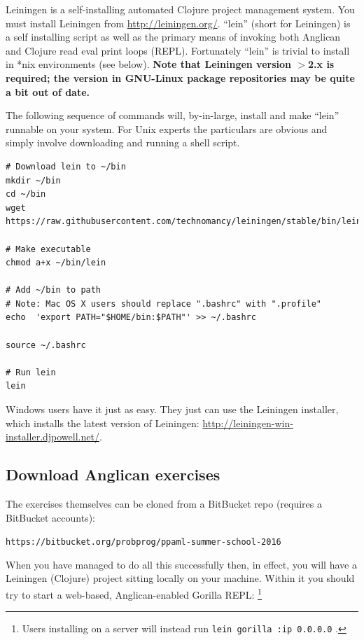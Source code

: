 \documentclass{article}
\begin{document}
Leiningen is a self-installing automated Clojure project management system.  
You must install Leiningen from \url{http://leiningen.org/}.  ``lein'' 
(short for Leiningen) is a self installing script as well as the primary means
of invoking both Anglican and Clojure read eval print loops (REPL).  Fortunately
``lein'' is trivial to install in *nix environments (see below).
\textbf{ Note that Leiningen version $>$2.x is required; the version in  
GNU-Linux package repositories may be quite a bit out of date.}

The following sequence of commands will, by-in-large, install and make ``lein'' runnable on your system.  For Unix experts the particulars are obvious and simply involve downloading and running a shell script.

\begin{verbatim}
# Download lein to ~/bin
mkdir ~/bin
cd ~/bin
wget https://raw.githubusercontent.com/technomancy/leiningen/stable/bin/lein

# Make executable
chmod a+x ~/bin/lein

# Add ~/bin to path
# Note: Mac OS X users should replace ".bashrc" with ".profile"
echo  'export PATH="$HOME/bin:$PATH"' >> ~/.bashrc 

source ~/.bashrc

# Run lein
lein
\end{verbatim}

\noindent Windows users have it just as easy. They just can use the Leiningen installer, which installs the latest version of Leiningen: \url{http://leiningen-win-installer.djpowell.net/}.

\subsection{Download Anglican exercises}

The exercises themselves can be cloned from a BitBucket repo (requires a BitBucket accounts):

\vspace{5mm}

\texttt{https://bitbucket.org/probprog/ppaml-summer-school-2016}

\newpage
When you have managed to do all this successfully then, in effect, you will have a 
Leiningen (Clojure) project sitting locally on your machine.   Within it  
you should try to start a web-based, Anglican-enabled Gorilla REPL:
\footnote{Users installing on a server will instead run \texttt{lein gorilla :ip 0.0.0.0} .}
\end{document}
